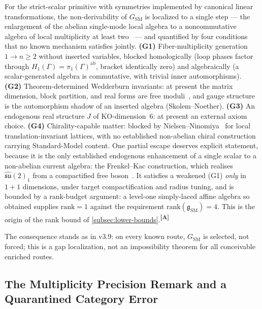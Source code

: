 \documentclass[12pt,a4paper,twoside]{article}
\theoremstyle{plain}
\theoremstyle{definition}
\theoremstyle{remark}
\newcommand{\catmark}[1]{\textsuperscript{\textsf{\textbf{[#1]}}}}
\begin{document}
For the strict-scalar primitive with symmetries implemented by canonical
linear transformations, the non-derivability of $G_{\mathrm{SM}}$ is
localized to a single step --- the enlargement of the abelian single-mode
local algebra to a noncommutative algebra of local multiplicity at least
two~\cite{krajewski1998,paschkesitarz1998} --- and quantified by four conditions that no known mechanism
satisfies jointly. \textbf{(G1)} Fiber-multiplicity generation
$1 \to n \geq 2$ without inserted variables, blocked homologically (loop
phases factor through $H_1(\Gamma) = \pi_1(\Gamma)^{\mathrm{ab}}$, bracket
identically zero) and algebraically (a scalar-generated algebra is
commutative, with trivial inner automorphisms). \textbf{(G2)}
Theorem-determined Wedderburn invariants: at present the matrix dimension,
block partition, and real forms are free moduli~\cite{cacic2011}, and gauge structure is
the automorphism shadow of an inserted algebra (Skolem--Noether).
\textbf{(G3)} An endogenous real structure $J$ of KO-dimension~6: at
present an external axiom choice. \textbf{(G4)} Chirality-capable matter:
blocked by Nielsen--Ninomiya~\cite{nielsen1981} for local translation-invariant lattices,
with no established non-abelian chiral construction carrying
Standard-Model content. One partial escape deserves explicit statement, because it is the only
established endogenous enhancement of a single scalar to a non-abelian
current algebra: the Frenkel--Kac construction, which realises
$\widehat{\mathfrak{su}}(2)_1$ from a compactified free
boson~\cite{frenkelkac1980,goddardolive1986}. It satisfies a weakened
(G1) \emph{only} in $1{+}1$ dimensions, under target compactification
and radius tuning, and is bounded by a rank-budget argument: a level-one
simply-laced affine algebra so obtained supplies $\mathrm{rank} = 1$
against the requirement $\mathrm{rank}(\mathfrak g_{\mathrm{SM}}) = 4$.
This is the origin of the rank bound of
\cref{subsec:lower-bounds}.\catmark{A}

The consequence stands as in v3.9: on every known
route, $G_{\mathrm{SM}}$ is selected, not forced; this is a gap
localization, not an impossibility theorem for all conceivable enriched
routes.

\subsection{The Multiplicity Precision Remark and a Quarantined Category Error}
\label{subsec:multiplicity-precision}
\end{document}
